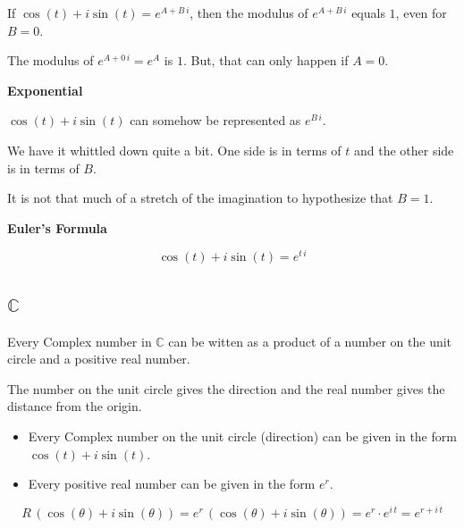 \documentclass{ximera}
\begin{document}
If $\cos(t) + i \sin(t) = e^{A + B \, i}$, then the modulus of $e^{A + B \, i}$ equals $1$, even for $B = 0$.

The modulus of $e^{A + 0 \, i} = e^A$ is $1$.  But, that can only happen if $A=0$.



\begin{conclusion} \textbf{\textcolor{green!25!black}{Exponential}} 

$\cos(t) + i \sin(t)$ can somehow be represented as $e^{B \, i}$.


\end{conclusion}


We have it whittled down quite a bit.  One side is in terms of $t$ and the other side is in terms of $B$.

It is not that much of a stretch of the imagination to hypothesize that $B = 1$.








\begin{theorem} \textbf{\textcolor{-red!75!green}{Euler's Formula}} 



\[ \cos(t) + i \sin(t) = e^{t \, i} \]


\end{theorem}



\subsection*{$\mathbb{C}$}



Every Complex number in $\mathbb{C}$ can be witten as a product of a number on the unit circle and a positive real number.

The number on the unit circle gives the direction and the real number gives the distance from the origin.


\begin{itemize}
\item Every Complex number on the unit circle (direction) can be given in the form $\cos(t) + i \sin(t)$.
\item Every positive real number can be given in the form $e^r$.
\end{itemize}




\[ R \, (\cos(\theta) + i \sin(\theta)) = e^r  \, (\cos(\theta) + i \sin(\theta)) = e^r \cdot e^{i \, t} = e^{r + i \, t}\]
\end{document}
